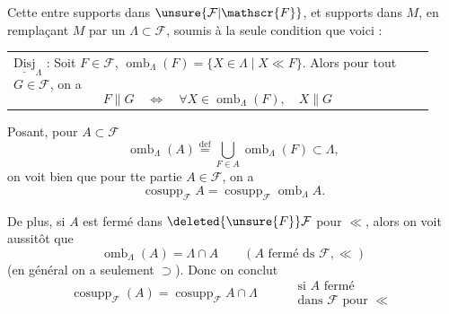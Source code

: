 


Cette  entre supports dans $\unsure{\mathcal{F}|\mathscr{F}}$, et supports dans $M$,  en remplaçant $M$ par un  $\Lambda\subset\mathcal{F}$, soumis à la seule condition que voici :

\noindent\begin{tabular}{|p{0.93\linewidth}}
$\underline{\mathrm{Disj}}_\Lambda$ : Soit $F\in\mathcal{F}$, $\operatorname{omb}_\Lambda(F)=\{X\in\Lambda\mid X\ll F\}$.
Alors pour tout $G\in\mathcal{F}$, on a
\[
F\parallel G\quad\Longleftrightarrow\quad\forall X\in\operatorname{omb}_\Lambda(F),\quad X\parallel G
\]
\end{tabular}

Posant, pour $A\subset\mathcal{F}$
\[
\operatorname{omb}_\Lambda(A)\overset{\mathrm{def}}{=}\bigcup_{F\in A}\operatorname{omb}_\Lambda(F)\subset\Lambda,
\]
on voit bien que pour tte partie $A\in\mathcal{F}$, on a
\[
\operatorname{cosupp}_{\mathcal{F}}A=\operatorname{cosupp}_{\mathcal{F}}\operatorname{omb}_\Lambda A.
\]

De plus, si $A$ est fermé dans $\deleted{\unsure{F}}\mathcal{F}$ pour $\ll$, alors on voit aussitôt que
\[
\operatorname{omb}_\Lambda(A)=\Lambda\cap A\qquad(A\text{ fermé ds }\mathcal{F},\ll)
\]
(en général on a seulement $\supset$). Donc on conclut
\[
\operatorname{cosupp}_{\mathcal{F}}(A)=\operatorname{cosupp}_{\mathcal{F}}A\cap\Lambda
\qquad\begin{aligned}&\text{si }A\text{ fermé}\\&\text{dans }\mathcal{F}\text{ pour }\ll\end{aligned}
\]

